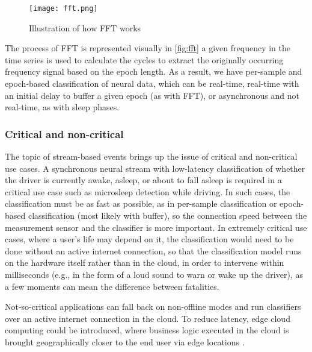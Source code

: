 \begin{figure}[!ht]
  \centering
  \texttt{[image: fft.png]}
  \caption[Illustration of how FFT works]{Illustration of how FFT works \citep{3blue1brown_but_2018}}
  \label{fig:fft}
\end{figure}

The process of FFT is represented visually in \autoref{fig:fft} a given frequency in the time series is used to calculate the cycles to extract the originally occurring frequency signal based on the epoch length. As a result, we have per-sample and epoch-based classification of neural data, which can be real-time, real-time with an initial delay to buffer a given epoch (as with FFT), or asynchronous and not real-time, as with sleep phases.


\subsubsection{Critical and non-critical}
\label{chapter5-critical-and-non-critical}

The topic of stream-based events brings up the issue of critical and non-critical use cases. A synchronous neural stream with low-latency classification of whether the driver is currently awake, asleep, or about to fall asleep is required in a critical use case such as microsleep detection while driving. In such cases, the classification must be as fast as possible, as in per-sample classification or epoch-based classification (most likely with buffer), so the connection speed between the measurement sensor and the classifier is more important. In extremely critical use cases, where a user's life may depend on it, the classification would need to be done without an active internet connection, so that the classification model runs on the hardware itself rather than in the cloud, in order to intervene within milliseconds (e.g., in the form of a loud sound to warn or wake up the driver), as a few moments can mean the difference between fatalities.

Not-so-critical applications can fall back on non-offline modes and run classifiers over an active internet connection in the cloud. To reduce latency, edge cloud computing could be introduced, where business logic executed in the cloud is brought geographically closer to the end user via edge locations \citep{nomios_what_nodate}.

